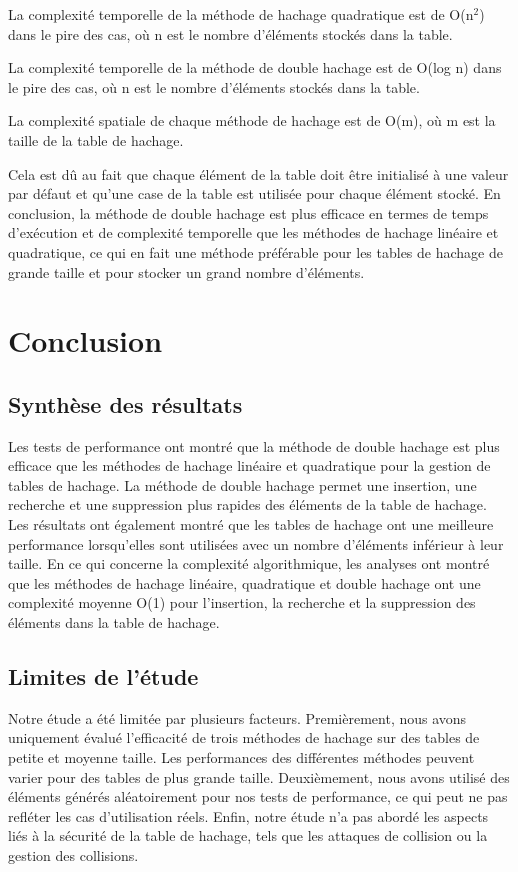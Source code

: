 \documentclass[12pt]{article}
\begin{document}
    La complexité temporelle de la méthode de hachage quadratique est de O(n$^2$) dans le pire des cas, où n est le nombre d'éléments stockés dans la table.

    La complexité temporelle de la méthode de double hachage est de O(log n) dans le pire des cas, où n est le nombre d'éléments stockés dans la table.

    La complexité spatiale de chaque méthode de hachage est de O(m), où m est la taille de la table de hachage.

    Cela est dû au fait que chaque élément de la table doit être initialisé à une valeur par défaut et qu'une case de la table est utilisée pour chaque élément stocké.
    En conclusion, la méthode de double hachage est plus efficace en termes de temps d'exécution et de complexité temporelle que les méthodes de hachage linéaire et quadratique, ce qui en fait une méthode préférable pour les tables de hachage de grande taille et pour stocker un grand nombre d'éléments.

    \section{Conclusion}\label{sec:Conclusion}
    \subsection{Synthèse des résultats}\label{subsec:synthese-des-resultats}
    Les tests de performance ont montré que la méthode de double hachage est plus efficace que les méthodes de hachage linéaire et quadratique pour la gestion de tables de hachage.
    La méthode de double hachage permet une insertion, une recherche et une suppression plus rapides des éléments de la table de hachage.
    Les résultats ont également montré que les tables de hachage ont une meilleure performance lorsqu'elles sont utilisées avec un nombre d'éléments inférieur à leur taille.
    En ce qui concerne la complexité algorithmique, les analyses ont montré que les méthodes de hachage linéaire, quadratique et double hachage ont une complexité moyenne O(1) pour l'insertion, la recherche et la suppression des éléments dans la table de hachage.
    \subsection{Limites de l'étude}\label{subsec:limites-de-l'etude}
    Notre étude a été limitée par plusieurs facteurs.
    Premièrement, nous avons uniquement évalué l'efficacité de trois méthodes de hachage sur des tables de petite et moyenne taille.
    Les performances des différentes méthodes peuvent varier pour des tables de plus grande taille.
    Deuxièmement, nous avons utilisé des éléments générés aléatoirement pour nos tests de performance, ce qui peut ne pas refléter les cas d'utilisation réels.
    Enfin, notre étude n'a pas abordé les aspects liés à la sécurité de la table de hachage, tels que les attaques de collision ou la gestion des collisions.
\end{document}
